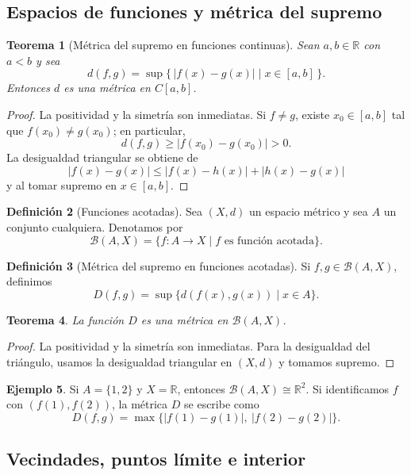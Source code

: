 \documentclass[12pt]{article}
\theoremstyle{definition}
\newtheorem{definition}{Definición}[section]
\newtheorem{example}[definition]{Ejemplo}
\theoremstyle{plain}
\newtheorem{theorem}[definition]{Teorema}
\theoremstyle{remark}
\begin{document}
\subsection*{Espacios de funciones y métrica del supremo}

\begin{theorem}[Métrica del supremo en funciones continuas]
Sean $a,b\in\mathbb R$ con $a<b$ y sea
\[
d(f,g)=\sup\{\,|f(x)-g(x)|\mid x\in[a,b]\,\}.
\]
Entonces $d$ es una métrica en $C[a,b]$.
\end{theorem}

\begin{proof}
La positividad y la simetría son inmediatas. Si $f\neq g$, existe $x_0\in[a,b]$ tal que $f(x_0)\neq g(x_0)$; en particular,
\[
d(f,g)\ge |f(x_0)-g(x_0)|>0.
\]
La desigualdad triangular se obtiene de
\[
|f(x)-g(x)|\le |f(x)-h(x)|+|h(x)-g(x)|
\]
y al tomar supremo en $x\in[a,b]$.
\end{proof}

\begin{definition}[Funciones acotadas]
Sea $(X,d)$ un espacio métrico y sea $A$ un conjunto cualquiera. Denotamos por
\[
\mathcal B(A,X)=\{f\colon A\to X\mid f \text{ es función acotada}\}.
\]
\end{definition}

\begin{definition}[Métrica del supremo en funciones acotadas]
Si $f,g\in\mathcal B(A,X)$, definimos
\[
D(f,g)=\sup\{d(f(x),g(x))\mid x\in A\}.
\]
\end{definition}

\begin{theorem}
La función $D$ es una métrica en $\mathcal B(A,X)$.
\end{theorem}

\begin{proof}
La positividad y la simetría son inmediatas. Para la desigualdad del triángulo, usamos la desigualdad triangular en $(X,d)$ y tomamos supremo.
\end{proof}

\begin{example}
Si $A=\{1,2\}$ y $X=\mathbb R$, entonces $\mathcal B(A,X)\cong\mathbb R^2$. Si identificamos $f$ con $(f(1),f(2))$, la métrica $D$ se escribe como
\[
D(f,g)=\max\{|f(1)-g(1)|,\ |f(2)-g(2)|\}.
\]
\end{example}

\subsection*{Vecindades, puntos límite e interior}
\end{document}
